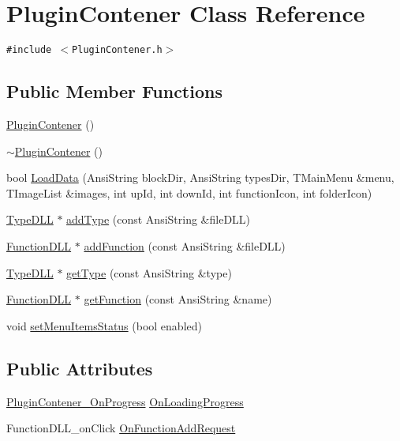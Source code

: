 \hypertarget{classPluginContener}{
\section{PluginContener Class Reference}
\label{classPluginContener}
}
{\tt \#include $<$PluginContener.h$>$}

\subsection*{Public Member Functions}
\begin{CompactItemize}
\item 
\hyperlink{classPluginContener_add74dce0031e59011ff0e147eb3be98}{PluginContener} ()
\item 
\hyperlink{classPluginContener_5be9154e3104ea30ebc2abe27ed740a3}{$\sim$PluginContener} ()
\item 
bool \hyperlink{classPluginContener_21655d404d32e8a2f2c8918d2751ea16}{LoadData} (AnsiString blockDir, AnsiString typesDir, TMainMenu \&menu, TImageList \&images, int upId, int downId, int functionIcon, int folderIcon)
\item 
\hyperlink{classTypeDLL}{TypeDLL} $\ast$ \hyperlink{classPluginContener_8cb31600aba8d95004d182187a2ed42b}{addType} (const AnsiString \&fileDLL)
\item 
\hyperlink{classFunctionDLL}{FunctionDLL} $\ast$ \hyperlink{classPluginContener_4ecede9ea722920d63fed61089084b52}{addFunction} (const AnsiString \&fileDLL)
\item 
\hyperlink{classTypeDLL}{TypeDLL} $\ast$ \hyperlink{classPluginContener_647864e7e0602077aad6a56155f4978a}{getType} (const AnsiString \&type)
\item 
\hyperlink{classFunctionDLL}{FunctionDLL} $\ast$ \hyperlink{classPluginContener_8a9049d660fbd61f00913c580df3b314}{getFunction} (const AnsiString \&name)
\item 
void \hyperlink{classPluginContener_e8efe6e2f12f6b67bd651c712aaf3b47}{setMenuItemsStatus} (bool enabled)
\end{CompactItemize}
\subsection*{Public Attributes}
\begin{CompactItemize}
\item 
\hyperlink{PluginContener_8h_6050db466be0b09e7cdf5c163966f217}{PluginContener\_\-OnProgress} \hyperlink{classPluginContener_b43b8d2068dc7e853cd25fac856496d0}{OnLoadingProgress}
\item 
FunctionDLL\_\-onClick \hyperlink{classPluginContener_a02d916f81857542ff8c77aa0c8b4dd6}{OnFunctionAddRequest}
\end{CompactItemize}
